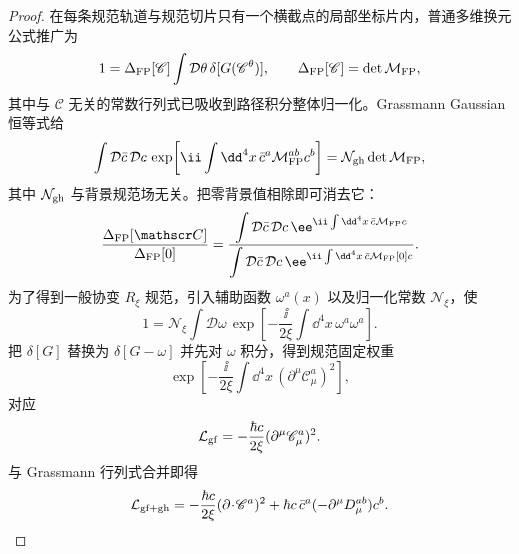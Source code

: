 \begin{proof}
在每条规范轨道与规范切片只有一个横截点的局部坐标片内，普通多维换元公式推广为
\begin{equation*}
 1=\Delta_{\rm FP}[\mathscr C]
 \int\mathcal D\theta\,\delta[G(\mathscr C^\theta)],
 \qquad
 \Delta_{\rm FP}[\mathscr C]=\det\mathcal M_{\rm FP},
\end{equation*}
其中与 $\mathscr C$ 无关的常数行列式已吸收到路径积分整体归一化。Grassmann Gaussian 恒等式给
\begin{equation*}
 \int\mathcal D\bar c\,\mathcal Dc\,
 \exp\!\left[
 \ii\int\dd^4x\,\bar c^a\mathcal M_{\rm FP}^{ab}c^b
 \right]
 =\mathcal N_{\rm gh}\det\mathcal M_{\rm FP},
\end{equation*}
其中 $\mathcal N_{\rm gh}$ 与背景规范场无关。把零背景值相除即可消去它：
\begin{equation*}
 \frac{\Delta_{\rm FP}[\mathscr C]}{\Delta_{\rm FP}[0]}
 =
 \frac{\displaystyle\int\mathcal D\bar c\,\mathcal Dc\,
 \ee^{\ii\int\dd^4x\,\bar c\mathcal M_{\rm FP}c}}
 {\displaystyle\int\mathcal D\bar c\,\mathcal Dc\,
 \ee^{\ii\int\dd^4x\,\bar c\mathcal M_{\rm FP}[0]c}}.
\end{equation*}
为了得到一般协变 $R_\xi$ 规范，引入辅助函数 $\omega^a(x)$ 以及归一化常数 $\mathcal N_\xi$，使
\begin{equation*}
 1=\mathcal N_\xi
 \int\mathcal D\omega\,
 \exp\!\left[-\frac{\ii}{2\xi}
 \int\dd^4x\,\omega^a\omega^a\right].
\end{equation*}
把 $\delta[G]$ 替换为 $\delta[G-\omega]$ 并先对 $\omega$ 积分，得到规范固定权重
\begin{equation*}
 \exp\!\left[-\frac{\ii}{2\xi}\int\dd^4x\,
 (\partial^\mu\mathscr C_\mu^a)^2\right],
\end{equation*}
对应
\begin{equation*}
 \mathcal L_{\rm gf}
 =-\frac{\hbar c}{2\xi}(\partial^\mu\mathscr C_\mu^a)^2.
\end{equation*}
与 Grassmann 行列式合并即得
\begin{equation*}
 \mathcal L_{\rm gf+gh}
 =-\frac{\hbar c}{2\xi}(\partial\!\cdot\!\mathscr C^a)^2
 +\hbar c\,\bar c^a(-\partial^\mu D_\mu^{ab})c^b.
\end{equation*}


\end{proof}
